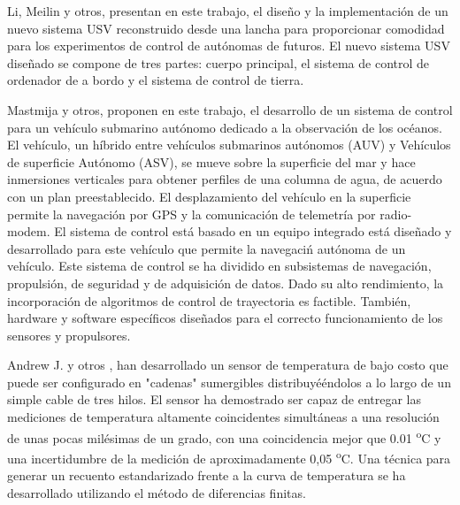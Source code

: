 Li, Meilin y otros\cite{li2012design}, presentan en este trabajo, el dise\~no y la implementaci\'on de un nuevo sistema USV reconstruido desde una lancha para proporcionar comodidad para los experimentos de control de aut\'onomas de futuros. El nuevo sistema USV dise\~nado se compone de tres partes: cuerpo principal, el sistema de control de ordenador de a bordo y el sistema de control de tierra. 

 Mastmija y otros\cite{masmitja2010development}, proponen en este trabajo, el desarrollo de un sistema de control para un veh\'iculo submarino autónomo dedicado a la observaci\'on de los oc\'eanos. El veh\'iculo, un h\'ibrido entre veh\'iculos submarinos aut\'onomos (AUV) y Veh\'iculos de superficie Aut\'onomo (ASV), se mueve sobre la superficie del mar y hace inmersiones verticales para obtener perfiles de una columna de agua, de acuerdo con un plan preestablecido. El desplazamiento del veh\'iculo en la superficie permite la navegaci\'on por GPS y la comunicaci\'on de telemetr\'ia por radio-modem. El sistema de control est\'a basado en un equipo integrado est\'a dise\~nado y desarrollado para este veh\'iculo que permite la navegaci\'n aut\'onoma de un veh\'iculo. Este sistema de control se ha dividido en subsistemas de navegaci\'on, propulsi\'on, de seguridad y de adquisici\'on de datos. Dado su alto rendimiento, la incorporaci\'on de algoritmos de control de trayectoria es factible. Tambi\'en, hardware y software espec\'ificos dise\~nados para el correcto funcionamiento de los sensores y propulsores.

Andrew J. y otros \cite{skinner2006using}, han desarrollado un sensor de temperatura de bajo costo que puede ser configurado en "cadenas" sumergibles distribuyé\'endolos a lo largo de un simple cable de tres hilos. El sensor ha demostrado ser capaz de entregar las mediciones de temperatura altamente coincidentes simult\'aneas a una resoluci\'on de unas pocas mil\'esimas de un grado, con una coincidencia mejor que 0.01  \textsuperscript{o}C y una incertidumbre de la medici\'on de aproximadamente 0,05  \textsuperscript{o}C. Una t\'ecnica para generar un recuento estandarizado frente a la curva de temperatura se ha desarrollado utilizando el m\'etodo de diferencias finitas.

